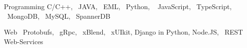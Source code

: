 


\begin{cvskills}

\vspace{2pt}
\cvskill
{Programming} %
{C/C++, ~JAVA, ~EML, ~Python, ~ JavaScript, ~TypeScript, ~MongoDB, ~MySQL, ~SpannerDB} %

\vspace{2pt}
\cvskill
{Web} %
{~Protobufs, ~gRpc, ~xBlend, ~xUIkit, Django in Python, Node.JS, ~REST Web-Services} %



\end{cvskills}